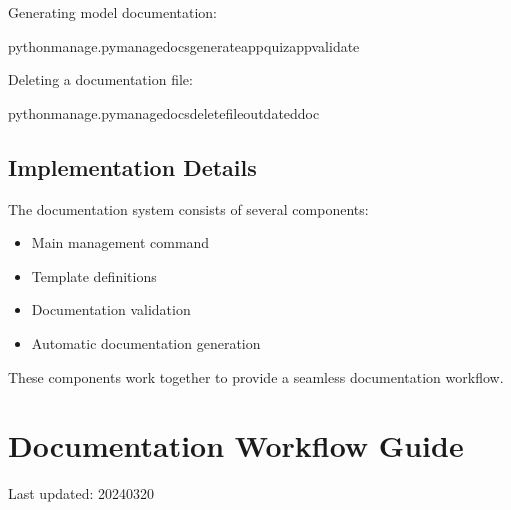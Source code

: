\documentclass[letterpaper,10pt,english]{sphinxmanual}
\begin{document}
\sphinxAtStartPar
Generating model documentation:

\begin{sphinxVerbatim}[commandchars=\\\{\}]
pythonmanage.pymanage\PYGZus{}docsgenerate\PYGZhy{}\PYGZhy{}appquiz\PYGZus{}app\PYGZhy{}\PYGZhy{}validate
\end{sphinxVerbatim}

\sphinxAtStartPar
Deleting a documentation file:

\begin{sphinxVerbatim}[commandchars=\\\{\}]
pythonmanage.pymanage\PYGZus{}docsdelete\PYGZhy{}\PYGZhy{}fileoutdated\PYGZus{}doc
\end{sphinxVerbatim}


\subsection{Implementation Details}
\label{\detokenize{documentation_tools:implementation-details}}
\sphinxAtStartPar
The documentation system consists of several components:
\begin{itemize}
\item {} 
\sphinxAtStartPar
{} \sphinxhyphen{} Main management command

\item {} 
\sphinxAtStartPar
{} \sphinxhyphen{} Template definitions

\item {} 
\sphinxAtStartPar
{} \sphinxhyphen{} Documentation validation

\item {} 
\sphinxAtStartPar
{} \sphinxhyphen{} Automatic documentation generation

\end{itemize}

\sphinxAtStartPar
These components work together to provide a seamless documentation workflow.

\sphinxstepscope


\section{Documentation Workflow Guide}
\label{\detokenize{documentation_workflow:documentation-workflow-guide}}\label{\detokenize{documentation_workflow::doc}}
\sphinxAtStartPar
Last updated: 2024\sphinxhyphen{}03\sphinxhyphen{}20
\end{document}
